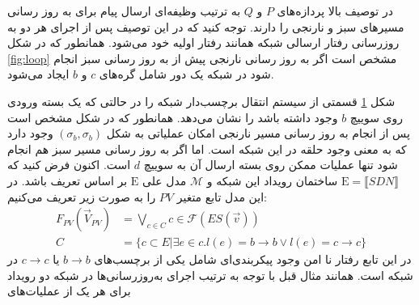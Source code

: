 \documentclass[
msc,
irfonts
]{./tex/tehran-thesis}
\newcommand{\پ}{پروژه/پایان‌نامه/رساله }
\theoremstyle{definition}
\theoremstyle{theorem}
\theoremstyle{definition}
\numberwithin{algorithm}{chapter}
\newcommand{\s}[1]{\{#1\}}
\newcommand{\sem}[1]{\llbracket #1 \rrbracket}
\newcommand{\his}[1]{\langle #1 \rangle}
\newcommand{\ra}{\rightarrow}
\newcommand{\mc}[1]{\mathcal{#1}}
\newcommand{\mr}[1]{\mathrm{#1}}
\newcommand{\f}[1]{F_{#1}(\vec V_{#1})}
\begin{document}
در توصیف بالا پردازه‌های
$P$
و
$Q$
به ترتیب وظیفه‌ای ارسال پیام برای به روز رسانی مسیر‌های سبز و نارنجی را دارند.
توجه کنید که در این توصیف پس از اجرای هر دو به روزرسانی رفتار ارسالی شبکه همانند رفتار اولیه خود می‌شود.
همانطور که در شکل
\ref{fig:loop}
مشخص است اگر به روز رسانی نارنجی پیش از به روز رسانی سبز انجام شود در شبکه یک دور شامل گره‌های
$c$
و
$b$
ایجاد می‌شود.
\begin{figure}
    \centering
    \caption{}
    \label{fig:loop:lts}
\end{figure}
شکل
\ref{fig:loop:lts}
قسمتی از سیستم انتقال برچسب‌دار شبکه را در حالتی که یک بسته ورودی روی سوییچ
$b$
وجود داشته باشد را نشان می‌دهد.
همانطور که در شکل مشخص است پس از انجام به روز رسانی مسیر نارنجی امکان عملیاتی به شکل
$(\sigma_b,\sigma_b)$
وجود دارد که به معنی وجود حلقه در این شبکه است.
اما اگر به روز رسانی مسیر سبز هم انجام شود تنها عملیات ممکن روی بسته ارسال آن به سوییچ
$d$
است.
اکنون فرض کنید که
$\mr{E} = \sem{SDN}$
ساختمان رویداد این شبکه و
$\mc{M}$
مدل علی
$\mr{E}$
بر اساس تعریف
باشد.
در این مدل تابع متغیر
$PV$
را به صورت زیر تعریف می‌کنیم:
\begin{align*}
    \f{PV} & = \bigvee_{c \in C} c \in \mathcal{F}(ES(\vec v)) \\
    C      & = \s{c \subset E | \exists e \in c.
        l(e) = b\ra b \vee l(e) = c\ra c }
\end{align*}
در این تابع رفتار نا امن وجود پیکربندی‌ای شامل یکی از برچسب‌های
$b \ra b$
یا
$c \ra c$
در شبکه است.
همانند مثال قبل با توجه به ترتیب اجرای به‌روز‌رسانی‌ها در شبکه دو رویداد برای هر یک از عملیات‌های
\end{document}
